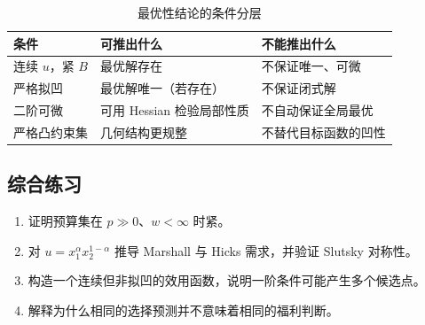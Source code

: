 \begin{table}[H]\centering\small
\begin{tabular}{p{3cm}p{4cm}p{4cm}}
\toprule
条件 & 可推出什么 & 不能推出什么\\
\midrule
连续 $u$，紧 $B$ & 最优解存在 & 不保证唯一、可微\\
严格拟凹 & 最优解唯一（若存在） & 不保证闭式解\\
二阶可微 & 可用 Hessian 检验局部性质 & 不自动保证全局最优\\
严格凸约束集 & 几何结构更规整 & 不替代目标函数的凹性\\
\bottomrule
\end{tabular}
\caption{最优性结论的条件分层}
\end{table}

\subsection{综合练习}
\begin{enumerate}
\item 证明预算集在 $p\gg0$、$w<\infty$ 时紧。
\item 对 $u=x_1^\alpha x_2^{1-\alpha}$ 推导 Marshall 与 Hicks 需求，并验证 Slutsky 对称性。
\item 构造一个连续但非拟凹的效用函数，说明一阶条件可能产生多个候选点。
\item 解释为什么相同的选择预测并不意味着相同的福利判断。
\end{enumerate}
